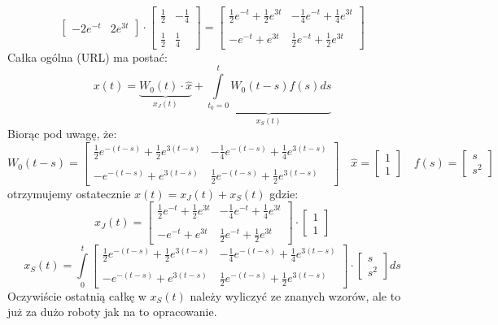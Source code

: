 \begin{przyk}
$$\begin{bmatrix}
-2e^{-t} & 2e^{3t}
\end{bmatrix}\cdot \begin{bmatrix}
\frac{1}{2} & -\frac{1}{4}\\
\\
\frac{1}{2} & \frac{1}{4}
\end{bmatrix}=
\begin{bmatrix}
\frac{1}{2}e^{-t}+\frac{1}{2}e^{3t} & -\frac{1}{4}e^{-t}+\frac{1}{4}e^{3t}\\
\\
-e^{-t}+e^{3t} & \frac{1}{2}e^{-t}+\frac{1}{2}e^{3t}
\end{bmatrix}$$
Całka ogólna (URL) ma postać:
$$x(t)=\underbrace{W_0(t)\cdot\hat{x}}_{x_J(t)}+\underbrace{\int\limits_{t_0=0}^tW_0(t-s)f(s)ds}_{x_S(t)}$$
Biorąc pod uwagę, że:$$W_0(t-s)=
\begin{bmatrix}
\frac{1}{2}e^{-(t-s)}+\frac{1}{2}e^{3(t-s)} & -\frac{1}{4}e^{-(t-s)}+\frac{1}{4}e^{3(t-s)}\\
\\
-e^{-(t-s)}+e^{3(t-s)} & \frac{1}{2}e^{-(t-s)}+\frac{1}{2}e^{3(t-s)}
\end{bmatrix}\quad\hat{x}=
\begin{bmatrix}
1\\
1
\end{bmatrix}\quad f(s)=
\begin{bmatrix}
s\\
s^2
\end{bmatrix}$$
otrzymujemy ostatecznie $x(t)=x_J(t)+x_S(t)$ gdzie: $$x_J(t)=
\begin{bmatrix}
\frac{1}{2}e^{-t}+\frac{1}{2}e^{3t} & -\frac{1}{4}e^{-t}+\frac{1}{4}e^{3t}\\
\\
-e^{-t}+e^{3t} & \frac{1}{2}e^{-t}+\frac{1}{2}e^{3t}
\end{bmatrix}\cdot
\begin{bmatrix}
1\\
1
\end{bmatrix}$$
$$x_S(t)=\int\limits_0^t
\begin{bmatrix}
\frac{1}{2}e^{-(t-s)}+\frac{1}{2}e^{3(t-s)} & -\frac{1}{4}e^{-(t-s)}+\frac{1}{4}e^{3(t-s)}\\
\\
-e^{-(t-s)}+e^{3(t-s)} & \frac{1}{2}e^{-(t-s)}+\frac{1}{2}e^{3(t-s)}
\end{bmatrix}\cdot
\begin{bmatrix}
s\\
s^2
\end{bmatrix}ds$$
Oczywiście ostatnią całkę w $x_S(t)$ należy wyliczyć ze znanych wzorów, ale to już za dużo roboty jak na to opracowanie.
\end{przyk}

